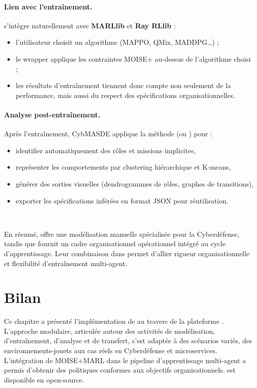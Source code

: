 \paragraph{Lien avec l'entraînement.}
 s'intègre naturellement avec \textbf{MARLlib} et \textbf{Ray RLlib} :
\begin{itemize}
  \item l'utilisateur choisit un algorithme (MAPPO, QMix, MADDPG…) ;
  \item le wrapper  applique les contraintes MOISE+ au-dessus de l'algorithme choisi ;
  \item les résultats d'entraînement tiennent donc compte non seulement de la performance, mais aussi du respect des spécifications organisationnelles.
\end{itemize}

\paragraph{Analyse post-entraînement.}
Après l'entraînement, CybMASDE applique la méthode  (ou ) pour :
\begin{itemize}
  \item identifier automatiquement des rôles et missions implicites,
  \item représenter les comportements par clustering hiérarchique et K-means,
  \item générer des sorties visuelles (dendrogrammes de rôles, graphes de transitions),
  \item exporter les spécifications inférées en format JSON pour réutilisation.
\end{itemize}

\

En résumé,  offre une modélisation manuelle spécialisée pour la Cyberdéfense, tandis que  fournit un cadre organisationnel opérationnel intégré au cycle d'apprentissage. Leur combinaison dans  permet d'allier rigueur organisationnelle et flexibilité d'entraînement multi-agent.


\section{Bilan}

Ce chapitre a présenté l'implémentation de  au travers de la plateforme . L'approche modulaire, articulée autour des activités de modélisation, d'entraînement, d'analyse et de transfert, s'est adaptée à des scénarios variés, des environnements-jouets aux cas réels en Cyberdéfense et microservices.
L'intégration de MOISE+MARL dans le pipeline d'apprentissage multi-agent a permis d'obtenir des politiques conformes aux objectifs organisationnels.  est disponible en open-source\footnotemark[1].

